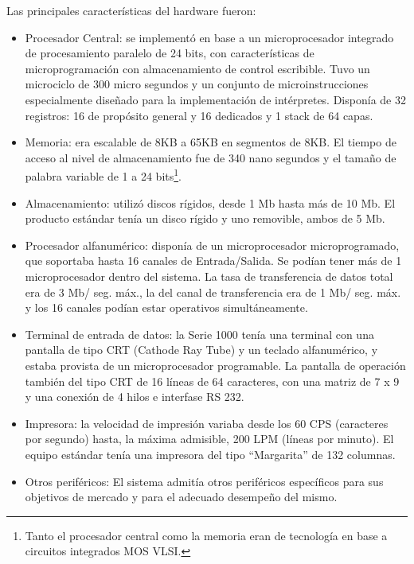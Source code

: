 \documentclass[%
 	final,
%
	notitlepage,
	narroweqnarray,
	inline,
 	twoside,
	]{ieee}
\begin{document}
Las principales caracter\'isticas del hardware fueron:\\
\begin{itemize}
\item Procesador Central: se implement\'o en base a un microprocesador integrado de procesamiento paralelo de 24 bits, con caracter\'isticas de microprogramaci\'on con almacenamiento de control escribible. Tuvo un microciclo de 300 micro segundos y un conjunto de microinstrucciones especialmente dise\~nado para la implementaci\'on de int\'erpretes. Dispon\'ia de 32 registros: 16 de prop\'osito general y 16 dedicados y 1 stack de 64 capas.\\
\item Memoria: era escalable de 8KB a 65KB en segmentos de 8KB. El tiempo de acceso al nivel de almacenamiento fue de 340 nano segundos y el tama\~no de palabra variable de 1 a 24 bits\footnote{Tanto el procesador central como la memoria eran de tecnolog\'ia en base a circuitos integrados MOS VLSI.}.\\
\item Almacenamiento: utiliz\'o discos r\'igidos, desde 1 Mb hasta m\'as de 10 Mb. El producto est\'andar ten\'ia un disco r\'igido y uno removible, ambos de 5 Mb.\\
\item Procesador alfanum\'erico: dispon\'ia de un microprocesador microprogramado, que soportaba hasta 16 canales de Entrada/Salida. Se pod\'ian tener m\'as de 1 microprocesador dentro del sistema. La tasa de transferencia de datos total era de 3 Mb/ seg. m\'ax., la del canal de transferencia era de 1 Mb/ seg. m\'ax. y los 16 canales pod\'ian estar operativos simult\'aneamente.\\
\item Terminal de entrada de datos: la Serie 1000 ten\'ia una terminal con una pantalla de tipo CRT (Cathode Ray Tube) y un teclado alfanum\'erico, y estaba provista de un microprocesador programable. La pantalla de operaci\'on tambi\'en del tipo CRT de 16 l\'ineas de 64 caracteres, con una matriz de 7 x 9 y una conexi\'on de 4 hilos e interfase RS 232.\\
\item Impresora: la velocidad de impresi\'on variaba desde los 60 CPS (caracteres por segundo) hasta, la m\'axima admisible, 200 LPM (l\'ineas por minuto). El equipo est\'andar ten\'ia una impresora del tipo ``Margarita'' de 132 columnas.\\
\item Otros perif\'ericos: El sistema admit\'ia otros perif\'ericos espec\'ificos para sus objetivos de mercado y para el adecuado desempe\~no del mismo.
\end{itemize}
\end{document}
